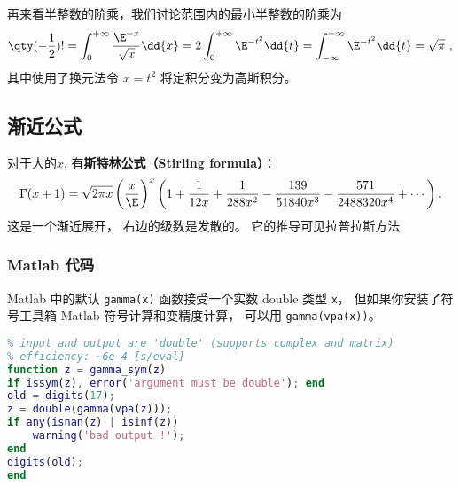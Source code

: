 再来看半整数的阶乘，我们讨论范围内的最小半整数的阶乘为 
\begin{equation}
\qty(-\frac12) ! = \int_0^{+\infty} \frac{\E^{-x}}{\sqrt x}\dd{x} = 2\int_0^{+\infty} \E^{-t^2} \dd{t} = \int_{-\infty}^{+\infty} \E^{-t^2} \dd{t} = \sqrt{\pi}~,
\end{equation}
其中使用了换元法令 $x = t^2$ 将定积分变为高斯积分。

\subsection{渐近公式}
对于大的$x$, 有\textbf{斯特林公式（Stirling formula）}：
$$
\Gamma(x+1)
  =\sqrt{2\pi x}\left({x\over \E}\right)^x
  \left(
   1
   +{1\over12x}
   +{1\over288x^2}
   -{139\over51840x^3}
   -{571\over2488320x^4}
   + \cdots
  \right).
$$
这是一个渐近展开， 右边的级数是发散的。 它的推导可见拉普拉斯方法

\subsubsection{Matlab 代码}
Matlab 中的默认 \verb|gamma(x)| 函数接受一个实数 double 类型 \verb|x|， 但如果你安装了符号工具箱 Matlab 符号计算和变精度计算， 可以用 \verb|gamma(vpa(x))|。
\begin{lstlisting}[language=matlab, caption=gamma\_sym.m]
% symbolic implementation of gamma function
% input and output are 'double' (supports complex and matrix)
% efficiency: ~6e-4 [s/eval]
function z = gamma_sym(z)
if issym(z), error('argument must be double'); end
old = digits(17);
z = double(gamma(vpa(z)));
if any(isnan(z) | isinf(z))
    warning('bad output !');
end
digits(old);
end
\end{lstlisting}
